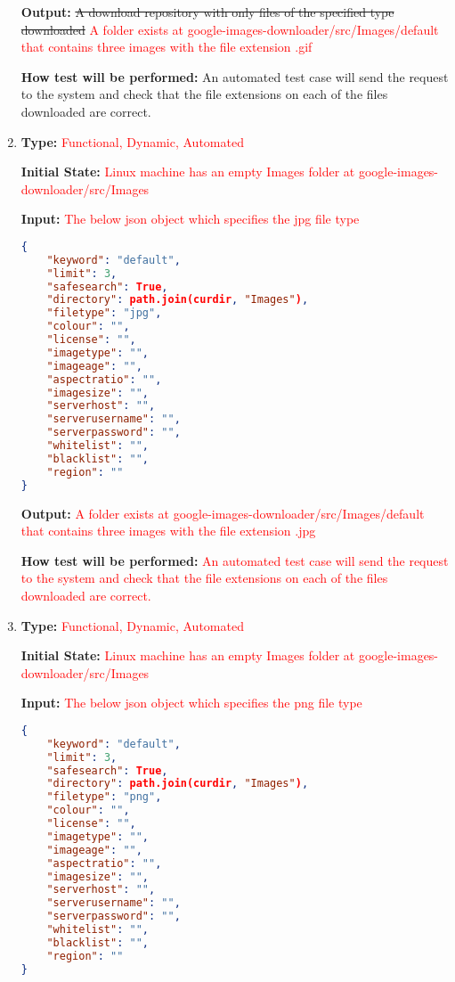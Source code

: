 \documentclass[12pt, titlepage]{article}
\begin{document}
\begin{enumerate}[label=FR-SQ\arabic*:, wide=0pt, leftmargin=*]
\textbf{Output:} \sout{A download repository with only files of the specified type downloaded}
\textcolor{red}{A folder exists at google-images-downloader/src/Images/default that contains
three images with the file extension .gif}
					
\textbf{How test will be performed:} An automated test case will send the request to the system and check that the file extensions on each of the files downloaded are correct.

\item \phantom{empty}

\textbf{Type:} \textcolor{red}{Functional, Dynamic, Automated}
					
\textbf{Initial State:} \textcolor{red}{Linux machine has an empty Images folder at google-images-downloader/src/Images}
					
\textbf{Input:} \textcolor{red}{The below json object which specifies the jpg file type}
\begin{lstlisting}[language=json,firstnumber=1]
{
	"keyword": "default",
	"limit": 3,
	"safesearch": True,
	"directory": path.join(curdir, "Images"),
	"filetype": "jpg",
	"colour": "",
	"license": "",
	"imagetype": "",
	"imageage": "",
	"aspectratio": "",
	"imagesize": "",
	"serverhost": "",
	"serverusername": "",
	"serverpassword": "",
	"whitelist": "",
	"blacklist": "",
	"region": ""
}
\end{lstlisting}
					
\textbf{Output:} \textcolor{red}{A folder exists at google-images-downloader/src/Images/default that contains
three images with the file extension .jpg}
					
\textbf{How test will be performed:} \textcolor{red}{An automated test case will send the request 
to the system and check that the file extensions on each of the files downloaded are correct.}

\item \phantom{empty}

\textbf{Type:} \textcolor{red}{Functional, Dynamic, Automated}
					
\textbf{Initial State:} \textcolor{red}{Linux machine has an empty Images folder at google-images-downloader/src/Images}
					
\textbf{Input:} \textcolor{red}{The below json object which specifies the png file type}
\begin{lstlisting}[language=json,firstnumber=1]
{
	"keyword": "default",
	"limit": 3,
	"safesearch": True,
	"directory": path.join(curdir, "Images"),
	"filetype": "png",
	"colour": "",
	"license": "",
	"imagetype": "",
	"imageage": "",
	"aspectratio": "",
	"imagesize": "",
	"serverhost": "",
	"serverusername": "",
	"serverpassword": "",
	"whitelist": "",
	"blacklist": "",
	"region": ""
}
\end{lstlisting}
					

\end{enumerate}
\end{document}
